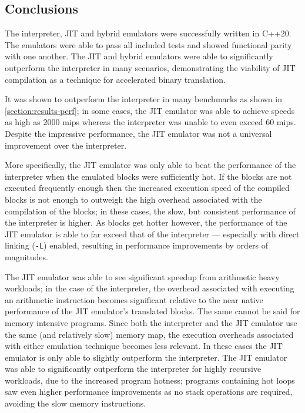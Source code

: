 \subsection{Conclusions}

The interpreter, JIT and hybrid emulators were successfully written in C++20. The emulators were able to pass all included tests and showed functional parity with one another. The JIT and hybrid emulators were able to significantly outperform the interpreter in many scenarios, demonstrating the viability of JIT compilation as a technique for accelerated binary translation.

It was shown to outperform the interpreter in many benchmarks as shown in \autoref{section:results-perf}; in some cases, the JIT emulator was able to achieve speeds as high as 2000 mips whereas the interpreter was unable to even exceed 60 mips. Despite the impressive performance, the JIT emulator was not a universal improvement over the interpreter.

More specifically, the JIT emulator was only able to beat the performance of the interpreter when the emulated blocks were sufficiently hot. If the blocks are not executed frequently enough then the increased execution speed of the compiled blocks is not enough to outweigh the high overhead associated with the compilation of the blocks; in these cases, the slow, but consistent performance of the interpreter is higher. As blocks get hotter however, the performance of the JIT emulator is able to far exceed that of the interpreter — especially with direct linking (\texttt{-L}) enabled, resulting in performance improvements by orders of magnitudes.

The JIT emulator was able to see significant speedup from arithmetic heavy workloads; in the case of the interpreter, the overhead associated with executing an arithmetic instruction becomes significant relative to the near native performance of the JIT emulator's translated blocks. The same cannot be said for memory intensive programs. Since both the interpreter and the JIT emulator use the same (and relatively slow) memory map, the execution overheads associated with either emulation technique becomes less relevant. In these cases the JIT emulator is only able to slightly outperform the interpreter. The JIT emulator was able to significantly outperform the interpreter for highly recursive workloads, due to the increased program hotness; programs containing hot loops saw even higher performance improvements as no stack operations are required, avoiding the slow memory instructions.

